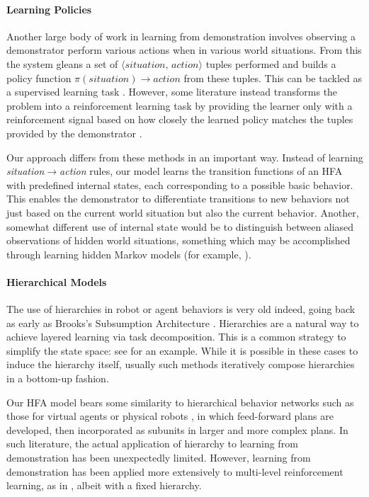\paragraph*{Learning Policies}
Another large body of work in learning from demonstration involves observing a demonstrator perform various actions when in various world situations.  From this the system gleans a set of \(\langle\textit{situation, action}\rangle\) tuples performed and builds a policy function \(\pi(\textit{situation})\rightarrow\textit{action}\) from these tuples.   This can be tackled as a supervised learning task \cite{Bain96aframework,DBLP:journals/ras/BentivegnaAC04,DBLP:conf/hri/CalinonB07,dinerstein07,DBLP:journals/ras/KasperFSP01,DBLP:journals/ras/NakanishiMECSK04}.  However, some literature instead transforms the problem into a reinforcement learning task by providing the learner only with a reinforcement signal based on how closely the learned policy matches the tuples provided by the demonstrator \cite{DBLP:journals/cacm/CoatesAN09,yasutake2}.

Our approach differs from these methods in an important way.  Instead of learning {\it situation\(\rightarrow\)action} rules, our model learns the transition functions of an HFA with predefined internal states, each corresponding to a possible basic behavior.  This enables the demonstrator to differentiate transitions to new behaviors not just based on the current world situation but also the current behavior.  Another, somewhat different use of internal state would be to distinguish between aliased observations of hidden world situations, something which may be accomplished through learning hidden Markov models (for example, \cite{4756000}).


\paragraph*{Hierarchical Models}
The use of hierarchies in robot or agent behaviors is very old indeed, going back as early as Brooks's Subsumption Architecture \cite{brooks}.  Hierarchies are a natural way to achieve layered learning \cite{DBLP:conf/ecml/StoneV00} via task decomposition.  This is a common strategy to simplify the state space: see \cite{4354062} for an example.  While it is possible in these cases to induce the hierarchy itself, usually such methods iteratively compose hierarchies in a bottom-up fashion.

Our HFA model bears some similarity to hierarchical behavior networks such as those for virtual agents \cite{Bindiganavale00dynamicallyaltering} or physical robots \cite{DBLP:conf/atal/NicolescuM02}, in which feed-forward plans are developed, then incorporated as subunits in larger and more complex plans.  In such literature, the actual application of hierarchy to learning from demonstration has been unexpectedly limited.  However, learning from demonstration has been applied more extensively to multi-level reinforcement learning, as in \cite{yasutake1}, albeit with a fixed hierarchy.

